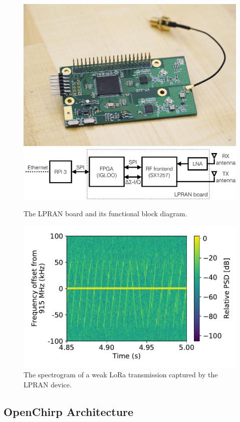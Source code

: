 \documentclass[conference]{IEEEtran}
\begin{document}
\begin{figure}[!htb]
    \centering
    \includegraphics[width=0.5\linewidth]{figures/gw-anon-sm}
    \\
    \includegraphics[width=0.8\linewidth]{figures/lpran-block_cropped}
    \caption{The LPRAN board and its functional block diagram.}
    \label{fig:lpran-photo}
\end{figure}

\begin{figure}[!htb]
    \centering
    \includegraphics[width=0.8\linewidth]{figures/LPRAN_spectrogram}
    \caption{The spectrogram of a weak LoRa transmission captured by the LPRAN device.}
    \label{fig:lpran-spectrogram}
\end{figure}

\subsection{OpenChirp Architecture}
\label{sec:oc-arch}
\end{document}
